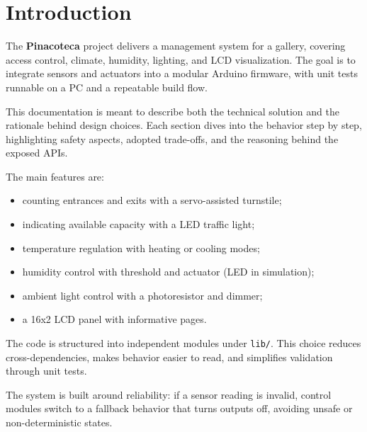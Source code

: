 \chapter{Introduction}

The \textbf{Pinacoteca} project delivers a management system for a gallery, covering access control, climate, humidity, lighting, and LCD visualization. The goal is to integrate sensors and actuators into a modular Arduino firmware, with unit tests runnable on a PC and a repeatable build flow.

This documentation is meant to describe both the technical solution and the rationale behind design choices. Each section dives into the behavior step by step, highlighting safety aspects, adopted trade-offs, and the reasoning behind the exposed APIs.

The main features are:
\begin{itemize}
  \item counting entrances and exits with a servo-assisted turnstile;
  \item indicating available capacity with a LED traffic light;
  \item temperature regulation with heating or cooling modes;
  \item humidity control with threshold and actuator (LED in simulation);
  \item ambient light control with a photoresistor and dimmer;
  \item a 16x2 LCD panel with informative pages.
\end{itemize}

The code is structured into independent modules under \texttt{lib/}. This choice reduces cross-dependencies, makes behavior easier to read, and simplifies validation through unit tests.

The system is built around reliability: if a sensor reading is invalid, control modules switch to a fallback behavior that turns outputs off, avoiding unsafe or non-deterministic states.
